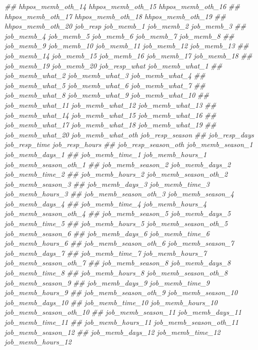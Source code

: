 \documentclass[
]{article}
\newenvironment{Shaded}{\begin{snugshade}}{\end{snugshade}}
\newcommand{\CommentTok}[1]{\textcolor[rgb]{0.56,0.35,0.01}{\textit{#1}}}
\begin{document}
\begin{Shaded}
\begin{Highlighting}[]
\CommentTok{##      hhpos_memb_oth_14 hhpos_memb_oth_15 hhpos_memb_oth_16}
\CommentTok{##      hhpos_memb_oth_17 hhpos_memb_oth_18 hhpos_memb_oth_19}
\CommentTok{##      hhpos_memb_oth_20 job_resp job_memb_1 job_memb_2 job_memb_3}
\CommentTok{##      job_memb_4 job_memb_5 job_memb_6 job_memb_7 job_memb_8}
\CommentTok{##      job_memb_9 job_memb_10 job_memb_11 job_memb_12 job_memb_13}
\CommentTok{##      job_memb_14 job_memb_15 job_memb_16 job_memb_17 job_memb_18}
\CommentTok{##      job_memb_19 job_memb_20 job_resp_what job_memb_what_1}
\CommentTok{##      job_memb_what_2 job_memb_what_3 job_memb_what_4}
\CommentTok{##      job_memb_what_5 job_memb_what_6 job_memb_what_7}
\CommentTok{##      job_memb_what_8 job_memb_what_9 job_memb_what_10}
\CommentTok{##      job_memb_what_11 job_memb_what_12 job_memb_what_13}
\CommentTok{##      job_memb_what_14 job_memb_what_15 job_memb_what_16}
\CommentTok{##      job_memb_what_17 job_memb_what_18 job_memb_what_19}
\CommentTok{##      job_memb_what_20 job_memb_what_oth job_resp_season}
\CommentTok{##      job_resp_days job_resp_time job_resp_hours}
\CommentTok{##      job_resp_season_oth job_memb_season_1 job_memb_days_1}
\CommentTok{##      job_memb_time_1 job_memb_hours_1 job_memb_season_oth_1}
\CommentTok{##      job_memb_season_2 job_memb_days_2 job_memb_time_2}
\CommentTok{##      job_memb_hours_2 job_memb_season_oth_2 job_memb_season_3}
\CommentTok{##      job_memb_days_3 job_memb_time_3 job_memb_hours_3}
\CommentTok{##      job_memb_season_oth_3 job_memb_season_4 job_memb_days_4}
\CommentTok{##      job_memb_time_4 job_memb_hours_4 job_memb_season_oth_4}
\CommentTok{##      job_memb_season_5 job_memb_days_5 job_memb_time_5}
\CommentTok{##      job_memb_hours_5 job_memb_season_oth_5 job_memb_season_6}
\CommentTok{##      job_memb_days_6 job_memb_time_6 job_memb_hours_6}
\CommentTok{##      job_memb_season_oth_6 job_memb_season_7 job_memb_days_7}
\CommentTok{##      job_memb_time_7 job_memb_hours_7 job_memb_season_oth_7}
\CommentTok{##      job_memb_season_8 job_memb_days_8 job_memb_time_8}
\CommentTok{##      job_memb_hours_8 job_memb_season_oth_8 job_memb_season_9}
\CommentTok{##      job_memb_days_9 job_memb_time_9 job_memb_hours_9}
\CommentTok{##      job_memb_season_oth_9 job_memb_season_10 job_memb_days_10}
\CommentTok{##      job_memb_time_10 job_memb_hours_10 job_memb_season_oth_10}
\CommentTok{##      job_memb_season_11 job_memb_days_11 job_memb_time_11}
\CommentTok{##      job_memb_hours_11 job_memb_season_oth_11 job_memb_season_12}
\CommentTok{##      job_memb_days_12 job_memb_time_12 job_memb_hours_12}

\end{Highlighting}
\end{Shaded}
\end{document}
